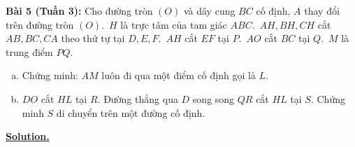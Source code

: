 \documentclass[12pt,a4paper]{article}
\begin{document}
	\textbf{Bài 5 (Tuần 3): }Cho đường tròn $(O)$ và dây cung $BC$ cố định, $A$ thay đổi trên đường tròn $(O).\enspace{H}$ là trực tâm của tam giác $ABC.\enspace{AH,BH,CH}$ cắt $AB,BC,CA$ theo thứ tự tại $D,E,F.\enspace{AH}$ cắt $EF$ tại $P.\enspace{AO}$ cắt $BC$ tại $Q.\enspace{M}$ là trung điểm $PQ$.
\begin{enumerate}[a)]
	\item Chứng minh: $AM$ luôn đi qua một điểm cố định gọi là $L$.
	\item $DO$ cắt $HL$ tại $R$. Đường thẳng qua $D$ song song $QR$ cắt $HL$ tại $S$. Chứng minh $S$ di chuyển trên một đường cố định.\\
\end{enumerate}

\underline{\textbf{Solution.}}\\
\end{document}

